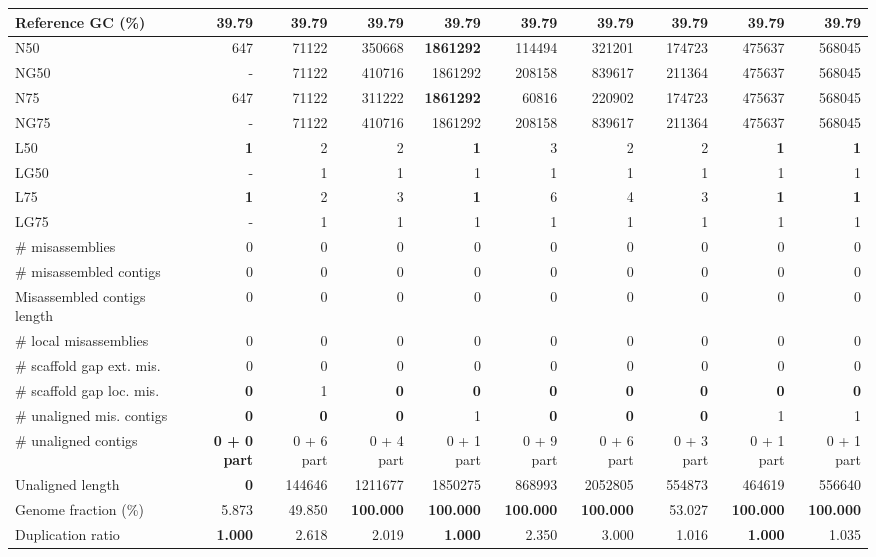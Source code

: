 \documentclass[12pt,a4paper]{article}
\begin{document}
\begin{table}[ht]
\begin{center}
\begin{tabular}{|l*{9}{|r}|}
Reference GC (\%) & 39.79 & 39.79 & 39.79 & 39.79 & 39.79 & 39.79 & 39.79 & 39.79 & 39.79 \\ \hline
N50 & 647 & 71122 & 350668 & {\bf 1861292} & 114494 & 321201 & 174723 & 475637 & 568045 \\ \hline
NG50 & - & 71122 & 410716 & 1861292 & 208158 & 839617 & 211364 & 475637 & 568045 \\ \hline
N75 & 647 & 71122 & 311222 & {\bf 1861292} & 60816 & 220902 & 174723 & 475637 & 568045 \\ \hline
NG75 & - & 71122 & 410716 & 1861292 & 208158 & 839617 & 211364 & 475637 & 568045 \\ \hline
L50 & {\bf 1} & 2 & 2 & {\bf 1} & 3 & 2 & 2 & {\bf 1} & {\bf 1} \\ \hline
LG50 & - & 1 & 1 & 1 & 1 & 1 & 1 & 1 & 1 \\ \hline
L75 & {\bf 1} & 2 & 3 & {\bf 1} & 6 & 4 & 3 & {\bf 1} & {\bf 1} \\ \hline
LG75 & - & 1 & 1 & 1 & 1 & 1 & 1 & 1 & 1 \\ \hline
\# misassemblies & 0 & 0 & 0 & 0 & 0 & 0 & 0 & 0 & 0 \\ \hline
\# misassembled contigs & 0 & 0 & 0 & 0 & 0 & 0 & 0 & 0 & 0 \\ \hline
Misassembled contigs length & 0 & 0 & 0 & 0 & 0 & 0 & 0 & 0 & 0 \\ \hline
\# local misassemblies & 0 & 0 & 0 & 0 & 0 & 0 & 0 & 0 & 0 \\ \hline
\# scaffold gap ext. mis. & 0 & 0 & 0 & 0 & 0 & 0 & 0 & 0 & 0 \\ \hline
\# scaffold gap loc. mis. & {\bf 0} & 1 & {\bf 0} & {\bf 0} & {\bf 0} & {\bf 0} & {\bf 0} & {\bf 0} & {\bf 0} \\ \hline
\# unaligned mis. contigs & {\bf 0} & {\bf 0} & {\bf 0} & 1 & {\bf 0} & {\bf 0} & {\bf 0} & 1 & 1 \\ \hline
\# unaligned contigs & {\bf 0 + 0 part} & 0 + 6 part & 0 + 4 part & 0 + 1 part & 0 + 9 part & 0 + 6 part & 0 + 3 part & 0 + 1 part & 0 + 1 part \\ \hline
Unaligned length & {\bf 0} & 144646 & 1211677 & 1850275 & 868993 & 2052805 & 554873 & 464619 & 556640 \\ \hline
Genome fraction (\%) & 5.873 & 49.850 & {\bf 100.000} & {\bf 100.000} & {\bf 100.000} & {\bf 100.000} & 53.027 & {\bf 100.000} & {\bf 100.000} \\ \hline
Duplication ratio & {\bf 1.000} & 2.618 & 2.019 & {\bf 1.000} & 2.350 & 3.000 & 1.016 & {\bf 1.000} & 1.035 \\ \hline

\end{tabular}
\end{center}
\end{table}
\end{document}
